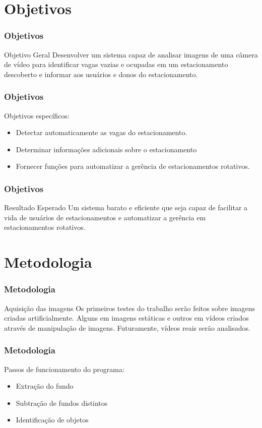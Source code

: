 \documentclass{beamer}
\begin{document}
\section{Objetivos}
\begin{frame}
\frametitle{Objetivos}
\begin{block}{Objetivo Geral}
Desenvolver um sistema capaz de analisar imagens de uma câmera de vídeo para identificar vagas vazias e ocupadas em um estacionamento descoberto e informar aos usuários e donos do estacionamento.
\end{block}

\end{frame}
\begin{frame}
\frametitle{Objetivos}
Objetivos específicos:
\begin{itemize}
  \item Detectar automaticamente as vagas do estacionamento.
  \item Determinar informações adicionais sobre o estacionamento
  \item Fornecer funções para automatizar a gerência de estacionamentos rotativos.
\end{itemize}

\end{frame}
\begin{frame}
\frametitle{Objetivos}
\begin{block}{Resultado Esperado}
Um sistema barato e eficiente que seja capaz de facilitar a vida de usuários de estacionamentos e automatizar a gerência em estacionamentos rotativos.
\end{block}
\end{frame}




\section{Metodologia}

\begin{frame}
\frametitle{Metodologia}
    \begin{block}{Aquisição das imagens}
    Os primeiros testes do trabalho serão feitos sobre imagens criadas artificialmente. Alguns em imagens estáticas e outros em vídeos criados através de manipulação de imagens. Futuramente, vídeos reais serão analisados.
    \end{block}
\end{frame}

\begin{frame}
\frametitle{Metodologia}
    Passos de funcionamento do programa:
    \begin{itemize}
        \item Extração do fundo
        \item Subtração de fundos distintos
        \item Identificação de objetos
    \end{itemize}
\end{frame}
\end{document}
